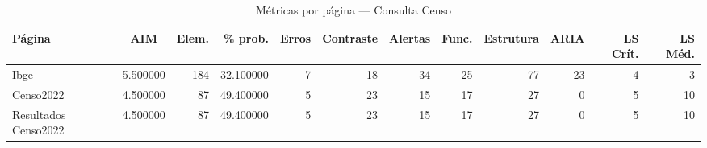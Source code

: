 \begin{table}[htbp]
  \centering
  \caption{Métricas por página — Consulta Censo}
  \label{tab:flow_consulta_censo}
  \small
  \begin{tabular}{lcrrrrrrrrrr}
\toprule
Página & AIM & Elem. & \% prob. & Erros & Contraste & Alertas & Func. & Estrutura & ARIA & LS Crít. & LS Méd. \\
\midrule
Ibge & 5.500000 & 184 & 32.100000 & 7 & 18 & 34 & 25 & 77 & 23 & 4 & 3 \\
Censo2022 & 4.500000 & 87 & 49.400000 & 5 & 23 & 15 & 17 & 27 & 0 & 5 & 10 \\
Resultados Censo2022 & 4.500000 & 87 & 49.400000 & 5 & 23 & 15 & 17 & 27 & 0 & 5 & 10 \\
\bottomrule
\end{tabular}
\end{table}
